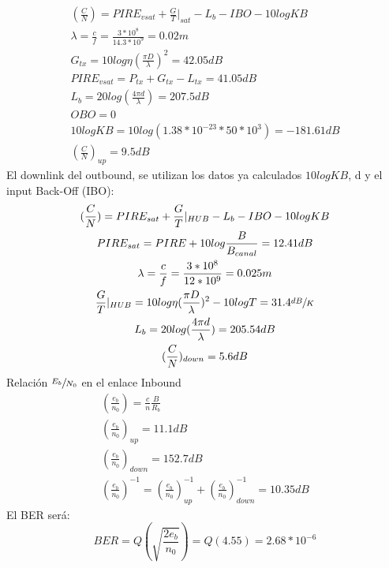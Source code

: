 \begin{exercise}[2]
\begin{gather*}
		(\frac{C}{N})=PIRE_{vsat}+\frac{G}{T}|_{sat}-L_b-IBO-10logKB\\
		\lambda=\frac{c}{f}=\frac{3*10^8}{14.3*10^9}=0.02m\\
		G_{tx}=10log\eta(\frac{\pi D}{\lambda})^2=42.05dB\\
		PIRE_{vsat}=P_{tx}+G_{tx}-L_{tx}=41.05dB\\
		L_b=20log(\frac{4\pi d}{\lambda})=207.5dB\\
		OBO=0\\
		10logKB=10log(1.38*10^{-23}*50*10^3)=-181.61dB\\
		(\frac{C}{N})_{up}=9.5dB
	\end{gather*}
	El downlink del outbound, se utilizan los datos ya calculados $10logKB$, d y el input Back-Off (IBO):
	\begin{gather*}
		(\frac{C}{N})=PIRE_{sat}+\frac{G}{T}|_{HUB}-L_b-IBO-10logKB\\
		PIRE_{sat}=PIRE+10log\frac{B}{B_{canal}}=12.41dB\\
		\lambda=\frac{c}{f}=\frac{3*10^8}{12*10^9}=0.025m\\
		\frac{G}{T}|_{HUB}=10log\eta(\frac{\pi D}{\lambda})^2-10logT=31.4\sfrac{dB}{K}\\
		L_b=20log(\frac{4\pi d}{\lambda})=205.54dB\\
		(\frac{C}{N})_{down}=5.6dB
	\end{gather*}
	Relación $\sfrac{E_b}{N_0}$ en el enlace Inbound
	\begin{gather*}
		(\frac{e_b}{n_0})=\frac{c}{n}\frac{B}{R_b}\\
		(\frac{e_b}{n_0})_{up}=11.1dB\\
		(\frac{e_b}{n_0})_{down}=152.7dB\\
		(\frac{e_b}{n_0})^{-1}=(\frac{e_b}{n_0})_{up}^{-1}+(\frac{e_b}{n_0})_{down}^{-1}=10.35dB
	\end{gather*}
	El BER será:
	\[BER=Q(\sqrt{\frac{2e_b}{n_0}})=Q(4.55)=2.68*10^{-6}\]
\end{exercise}
